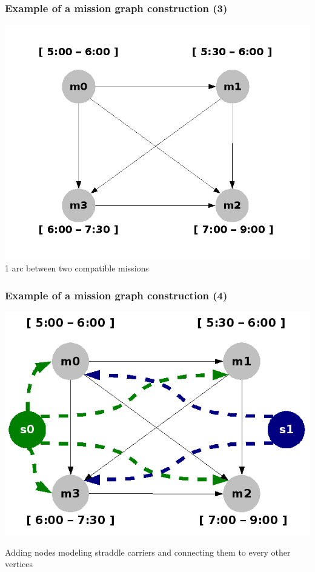 \documentclass{beamer}
\begin{document}
\begin{frame}
	\frametitle{Example of a mission graph construction (3)}
 	\begin{center}
 		\includegraphics[height=.50\textheight]{fig/precedence.png} \\

		1 arc between two compatible missions
	\end{center}
\end{frame}
\begin{frame}
	\frametitle{Example of a mission graph construction (4)}
 	\begin{center}
 		\includegraphics[height=.50\textheight]{fig/precedence_with_vehicles.png}
		
		Adding nodes modeling straddle carriers and connecting them to every other vertices
	\end{center}
\end{frame}
\end{document}
